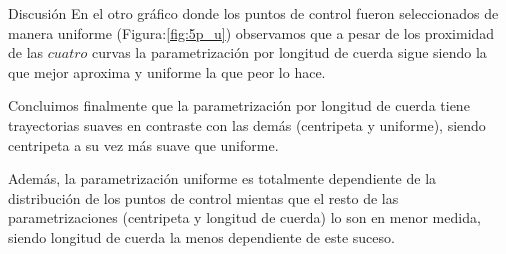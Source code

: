 \begin{section}{Discusión}
	En el otro gráfico donde los puntos de control fueron seleccionados de manera uniforme (Figura:\ref{fig:5p_u}) observamos que a pesar de los proximidad de las $cuatro$ curvas la parametrización por longitud de cuerda sigue siendo la que mejor aproxima y uniforme la que peor lo hace.
	
	Concluimos finalmente que la parametrización por longitud de cuerda tiene trayectorias suaves en contraste con las demás (centripeta y uniforme), siendo centripeta a su vez más suave que uniforme. 
	
	Además, la parametrización uniforme es totalmente dependiente de la distribución de los puntos de control mientas que el resto de las parametrizaciones (centripeta y longitud de cuerda) lo son en menor medida, siendo longitud de cuerda la menos dependiente de este suceso.
	
\end{section}
